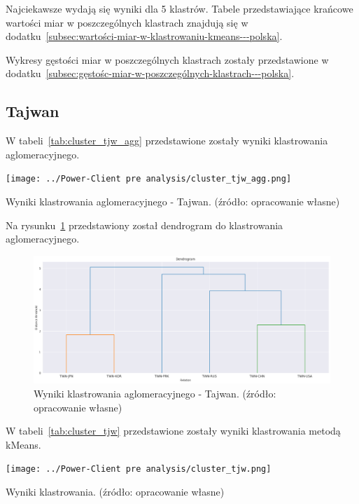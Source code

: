 \documentclass[11pt]{report}
\begin{document}
    Najciekawsze wydają się wyniki dla 5 klastrów.
    Tabele przedstawiające krańcowe wartości miar w poszczególnych klastrach znajdują się w dodatku~\ref{subsec:wartości-miar-w-klastrowaniu-kmeans---polska}.

    Wykresy gęstości miar w poszczególnych klastrach zostały przedstawione w dodatku~\ref{subsec:gęstośc-miar-w-poszczególnych-klastrach---polska}.

    \subsection{Tajwan}

    W tabeli~\ref{tab:cluster_tjw_agg} przedstawione zostały wyniki klastrowania aglomeracyjnego.
    \begin{table}[!htp]
        \centering
        \texttt{[image: ../Power-Client pre analysis/cluster\_tjw\_agg.png]}
        \caption{Wyniki klastrowania aglomeracyjnego - Tajwan. (źródło: opracowanie własne)}
        \label{tab:cluster_tjw_agg}
    \end{table}
    Na rysunku~\ref{fig:cluster_tjw_agg_dendrogram} przedstawiony został dendrogram do klastrowania aglomeracyjnego.
    \begin{figure}[!htp]
        \centering
        \includegraphics[width=\linewidth]{../Power-Client pre analysis/cluster_tjw_agg_dendrogram.png}
        \caption{Wyniki klastrowania aglomeracyjnego - Tajwan. (źródło: opracowanie własne)}
        \label{fig:cluster_tjw_agg_dendrogram}
    \end{figure}

    W tabeli~\ref{tab:cluster_tjw} przedstawione zostały wyniki klastrowania metodą kMeans.
    \begin{table}[!htp]
        \centering
        \texttt{[image: ../Power-Client pre analysis/cluster\_tjw.png]}
        \caption{Wyniki klastrowania. (źródło: opracowanie własne)}
        \label{tab:cluster_tjw}
    \end{table}
\end{document}

